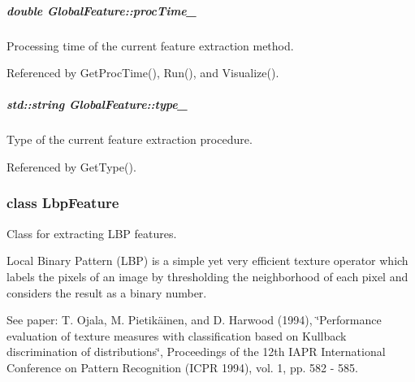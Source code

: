 \hypertarget{group___feature_extractor_aa3306975b929f5503dac51829f9e04a0}{
\subparagraph[{proc\-Time\-\_\-}]{\setlength{\rightskip}{0pt plus 5cm}double Global\-Feature\-::proc\-Time\-\_\-\hspace{0.3cm}{\ttfamily [protected]}}}\label{group___feature_extractor_aa3306975b929f5503dac51829f9e04a0}


Processing time of the current feature extraction method. 



Referenced by Get\-Proc\-Time(), Run(), and Visualize().

\hypertarget{group___feature_extractor_ad467857c4bc3d0fe65ba29e3b8f7c796}{
\subparagraph[{type\-\_\-}]{\setlength{\rightskip}{0pt plus 5cm}std\-::string Global\-Feature\-::type\-\_\-\hspace{0.3cm}{\ttfamily [protected]}}}\label{group___feature_extractor_ad467857c4bc3d0fe65ba29e3b8f7c796}


Type of the current feature extraction procedure. 



Referenced by Get\-Type().

\label{class_lbp_feature}
\hypertarget{group___feature_extractor_class_lbp_feature}{}
\subsubsection{class Lbp\-Feature}
Class for extracting L\-B\-P features. 

\begin{DoxyVerb}Local Binary Pattern (LBP) is a simple yet very efficient texture operator which labels the pixels of an image by thresholding the neighborhood of each pixel and considers the result as a binary number.
\end{DoxyVerb}


See paper\-: T. Ojala, M. Pietikäinen, and D. Harwood (1994), \char`\"{}\-Performance evaluation of texture measures with classification based on Kullback discrimination of distributions\char`\"{}, Proceedings of the 12th I\-A\-P\-R International Conference on Pattern Recognition (I\-C\-P\-R 1994), vol. 1, pp. 582 -\/ 585. 

